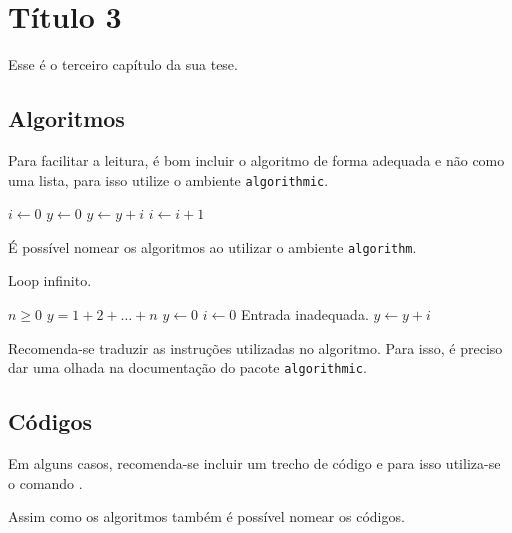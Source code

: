 \chapter{Título 3}
Esse é o terceiro capítulo da sua tese.

\section{Algoritmos}
Para facilitar a leitura, é bom incluir o algoritmo de forma
adequada e não como uma lista, para isso utilize o ambiente
\lstinline+algorithmic+.
\begin{algorithmic}[2]
  \STATE $i \leftarrow 0$
  \STATE $y \leftarrow 0$
    \STATE $y \leftarrow y + i$
    \STATE $i \leftarrow i + 1$
  \ENDFOR
\end{algorithmic}

É possível nomear os algoritmos ao utilizar o ambiente
\lstinline+algorithm+.
\begin{algorithm}
  \caption{Loop infinito.}
  \label{alg:loop_inf}
  \begin{algorithmic}
    \REQUIRE $n \geq 0$
    \ENSURE $y = 1 + 2 + \ldots + n$
    \STATE $y \leftarrow 0$
    \STATE $i \leftarrow 0$
      \PRINT Entrada inadequada.
    \ELSE
        \STATE $y \leftarrow y + i$
      \ENDWHILE
    \ENDIF
  \end{algorithmic}
\end{algorithm}

Recomenda-se traduzir as instruções utilizadas no algoritmo. Para isso, é
preciso dar uma olhada na documentação do pacote \lstinline+algorithmic+.

\section{Códigos}
Em alguns casos, recomenda-se incluir um trecho de
código e para isso utiliza-se o comando
\lstinline++.


Assim como os algoritmos também é possível nomear os códigos.

